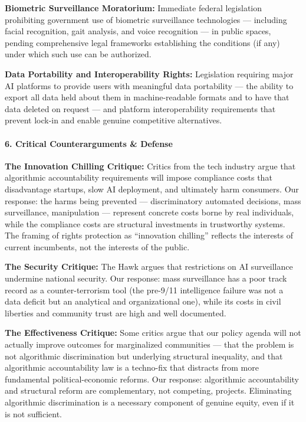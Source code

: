 \textbf{Biometric Surveillance Moratorium:} Immediate federal
legislation prohibiting government use of biometric surveillance
technologies --- including facial recognition, gait analysis, and voice
recognition --- in public spaces, pending comprehensive legal frameworks
establishing the conditions (if any) under which such use can be
authorized.

\textbf{Data Portability and Interoperability Rights:} Legislation
requiring major AI platforms to provide users with meaningful data
portability --- the ability to export all data held about them in
machine-readable formats and to have that data deleted on request ---
and platform interoperability requirements that prevent lock-in and
enable genuine competitive alternatives.

\paragraph{6. Critical Counterarguments \&
Defense}\label{critical-counterarguments-defense-34}

\textbf{The Innovation Chilling Critique:} Critics from the tech
industry argue that algorithmic accountability requirements will impose
compliance costs that disadvantage startups, slow AI deployment, and
ultimately harm consumers. Our response: the harms being prevented ---
discriminatory automated decisions, mass surveillance, manipulation ---
represent concrete costs borne by real individuals, while the compliance
costs are structural investments in trustworthy systems. The framing of
rights protection as ``innovation chilling'' reflects the interests of
current incumbents, not the interests of the public.

\textbf{The Security Critique:} The Hawk argues that restrictions on AI
surveillance undermine national security. Our response: mass
surveillance has a poor track record as a counter-terrorism tool (the
pre-9/11 intelligence failure was not a data deficit but an analytical
and organizational one), while its costs in civil liberties and
community trust are high and well documented.

\textbf{The Effectiveness Critique:} Some critics argue that our policy
agenda will not actually improve outcomes for marginalized communities
--- that the problem is not algorithmic discrimination but underlying
structural inequality, and that algorithmic accountability law is a
techno-fix that distracts from more fundamental political-economic
reforms. Our response: algorithmic accountability and structural reform
are complementary, not competing, projects. Eliminating algorithmic
discrimination is a necessary component of genuine equity, even if it is
not sufficient.

